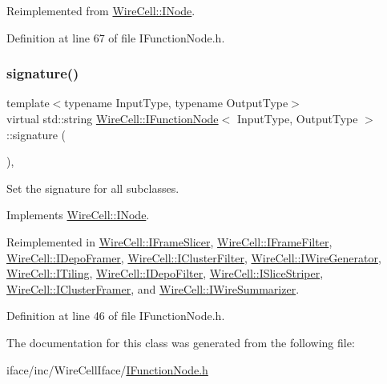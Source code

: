 Reimplemented from \hyperlink{class_wire_cell_1_1_i_node_aba7e537684cb4f2453796ff73da2d602}{Wire\+Cell\+::\+I\+Node}.



Definition at line 67 of file I\+Function\+Node.\+h.

\mbox{\label{class_wire_cell_1_1_i_function_node_af59f46cf19ca9fdf4aade1f289feedf2}} 
\subsubsection{\texorpdfstring{signature()}{signature()}}
{\footnotesize\ttfamily template$<$typename Input\+Type, typename Output\+Type$>$ \\
virtual std\+::string \hyperlink{class_wire_cell_1_1_i_function_node}{Wire\+Cell\+::\+I\+Function\+Node}$<$ Input\+Type, Output\+Type $>$\+::signature (\begin{DoxyParamCaption}{ }\end{DoxyParamCaption})\hspace{0.3cm}{\ttfamily [inline]}, {\ttfamily [virtual]}}



Set the signature for all subclasses. 



Implements \hyperlink{class_wire_cell_1_1_i_node_a0b0763465adf5ba7febe8e378162b584}{Wire\+Cell\+::\+I\+Node}.



Reimplemented in \hyperlink{class_wire_cell_1_1_i_frame_slicer_a1af9b9d4cc6a0925925a5d7de316e730}{Wire\+Cell\+::\+I\+Frame\+Slicer}, \hyperlink{class_wire_cell_1_1_i_frame_filter_ad6ce7c354f616ea9eec2f857165f936d}{Wire\+Cell\+::\+I\+Frame\+Filter}, \hyperlink{class_wire_cell_1_1_i_depo_framer_ad188e2d941d34583f13758689d0c331f}{Wire\+Cell\+::\+I\+Depo\+Framer}, \hyperlink{class_wire_cell_1_1_i_cluster_filter_a8cb61b08cad46dea00a76a5393a402f8}{Wire\+Cell\+::\+I\+Cluster\+Filter}, \hyperlink{class_wire_cell_1_1_i_wire_generator_adfafb9936be3d0d4165ca580d48513c6}{Wire\+Cell\+::\+I\+Wire\+Generator}, \hyperlink{class_wire_cell_1_1_i_tiling_a6ee9a22c6c5b01b5b56d343e5b69a243}{Wire\+Cell\+::\+I\+Tiling}, \hyperlink{class_wire_cell_1_1_i_depo_filter_a308041810acd84cc212497121c17ac02}{Wire\+Cell\+::\+I\+Depo\+Filter}, \hyperlink{class_wire_cell_1_1_i_slice_striper_af1d85a4c0813c7e2d7826b3006dca9bc}{Wire\+Cell\+::\+I\+Slice\+Striper}, \hyperlink{class_wire_cell_1_1_i_cluster_framer_a9609083f2abb8a7fea192970140f165d}{Wire\+Cell\+::\+I\+Cluster\+Framer}, and \hyperlink{class_wire_cell_1_1_i_wire_summarizer_aad4b2478a6e204a3333f3aa84e36a99a}{Wire\+Cell\+::\+I\+Wire\+Summarizer}.



Definition at line 46 of file I\+Function\+Node.\+h.



The documentation for this class was generated from the following file\+:\begin{DoxyCompactItemize}
\item 
iface/inc/\+Wire\+Cell\+Iface/\hyperlink{_i_function_node_8h}{I\+Function\+Node.\+h}\end{DoxyCompactItemize}

